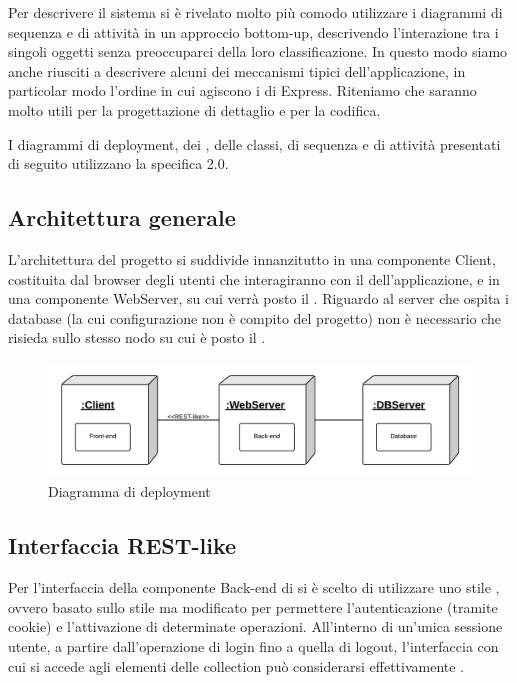 Per descrivere il sistema si è rivelato molto più comodo utilizzare i diagrammi di sequenza e di attività in un approccio bottom-up, descrivendo l'interazione tra i singoli oggetti senza preoccuparci della loro classificazione. In questo modo siamo anche riusciti a descrivere alcuni dei meccanismi tipici dell'applicazione, in particolar modo l'ordine in cui agiscono i  di Express. Riteniamo che saranno molto utili per la progettazione di dettaglio e per la codifica.

I diagrammi di deployment, dei , delle classi, di sequenza e di attività presentati di seguito utilizzano la specifica  2.0.

\subsection{Architettura generale}

L'architettura del progetto si suddivide innanzitutto in una componente Client, costituita dal browser degli utenti che interagiranno con il  dell'applicazione, e in una componente WebServer, su cui verrà posto il . Riguardo al server che ospita i database (la cui configurazione non è compito del progetto) non è necessario che risieda sullo stesso nodo su cui è posto il .

\begin{figure}[H]
\centering
\includegraphics[width=\textwidth]{uml/diagramma-deployment.png}
\caption{Diagramma di deployment}
\end{figure}

\subsection{Interfaccia REST-like}
Per l'interfaccia della componente Back-end di \ProjectName{} si è scelto di utilizzare uno stile , ovvero basato sullo stile  ma modificato per permettere l'autenticazione (tramite cookie) e l'attivazione di determinate operazioni. All'interno di un'unica sessione utente, a partire dall'operazione di login fino a quella di logout, l'interfaccia con cui si accede agli elementi delle collection può considerarsi effettivamente .

